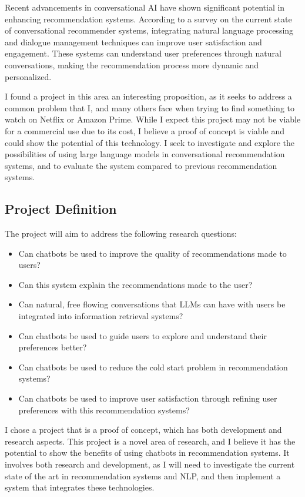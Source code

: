 Recent advancements in conversational AI have shown significant potential in enhancing recommendation systems. 
According to a survey\cite{Jannach_2021} on the current state of conversational recommender systems, integrating natural language processing and dialogue management techniques can improve user satisfaction and engagement. 
These systems can understand user preferences through natural conversations, making the recommendation process more dynamic and personalized.

I found a project in this area an interesting proposition, as it seeks to address a common problem that I, and many others face when trying to find something to watch on Netflix or Amazon Prime. 
While I expect this project may not be viable for a commercial use due to its cost, I believe a proof of concept is viable and could show the potential of this technology. 
I seek to investigate and explore the possibilities of using large language models in conversational recommendation systems, and to evaluate the system compared to previous recommendation systems.

\subsection{Project Definition}
\label{sec:project_definition}
The project will aim to address the following research questions:
\begin{itemize}
    \item Can chatbots be used to improve the quality of recommendations made to users?
    \item Can this system explain the recommendations made to the user?
    \item Can natural, free flowing conversations that LLMs can have with users be integrated into information retrieval systems?
    \item Can chatbots be used to guide users to explore and understand their preferences better?
    \item Can chatbots be used to reduce the cold start problem in recommendation systems?
    \item Can chatbots be used to improve user satisfaction through refining user preferences with this recommendation systems?
\end{itemize}

I chose a project that is a proof of concept, which has both development and research aspects.
This project is a novel area of research, and I believe it has the potential to show the benefits of using chatbots in recommendation systems.
It involves both research and development, as I will need to investigate the current state of the art in recommendation systems and NLP, and then implement a system that integrates these technologies.





